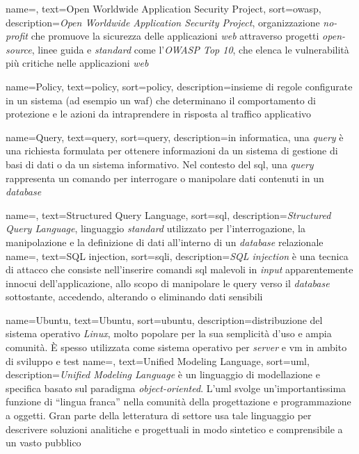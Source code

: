

 {
    name=,
    text=Open Worldwide Application Security Project,
    sort=owasp,
    description={\emph{Open Worldwide Application Security Project}, organizzazione \emph{no-profit} che promuove la sicurezza delle applicazioni \emph{web} attraverso progetti \emph{open-source}, linee guida e \emph{standard} come l'\emph{OWASP Top 10}, che elenca le vulnerabilità più critiche nelle applicazioni \emph{web}}
}

 {
    name=Policy,
    text=policy,
    sort=policy,
    description={insieme di regole configurate in un sistema (ad esempio un \gls{waf}) che determinano il comportamento di protezione e le azioni da intraprendere in risposta al traffico applicativo}
}

 {
    name=Query,
    text=query,
    sort=query,
    description={in informatica, una \emph{query} è una richiesta formulata per ottenere informazioni da un sistema di gestione di basi di dati o da un sistema informativo. Nel contesto del \gls{sql}, una \emph{query} rappresenta un comando per interrogare o manipolare dati contenuti in un \emph{database}}
}


 {
    name=,
    text=Structured Query Language,
    sort=sql,
    description={\emph{Structured Query Language}, linguaggio \emph{standard} utilizzato per l'interrogazione, la manipolazione e la definizione di dati all'interno di un \emph{database} relazionale}
}
 {
    name=,
    text=SQL injection,
    sort=sqli,
    description={\emph{SQL injection} è una tecnica di attacco che consiste nell'inserire comandi \gls{sql} malevoli in \emph{input} apparentemente innocui dell'applicazione, allo scopo di manipolare le \gls{query} verso il \emph{database} sottostante, accedendo, alterando o eliminando dati sensibili}
}


 {
    name=Ubuntu,
    text=Ubuntu,
    sort=ubuntu,
    description={distribuzione del sistema operativo \emph{Linux}, molto popolare per la sua semplicità d'uso e ampia comunità. È spesso utilizzata come sistema operativo per \emph{server} e \gls{vm} in ambito di sviluppo e test}
}
 {
    name=,
    text=Unified Modeling Language,
    sort=uml,
    description={\emph{Unified Modeling Language} è un linguaggio di modellazione e specifica basato sul paradigma \emph{object-oriented}. L'\gls{uml} svolge un'importantissima funzione di ``lingua franca'' nella comunità della progettazione e programmazione a oggetti. Gran parte della letteratura di settore usa tale linguaggio per descrivere soluzioni analitiche e progettuali in modo sintetico e comprensibile a un vasto pubblico}
}

